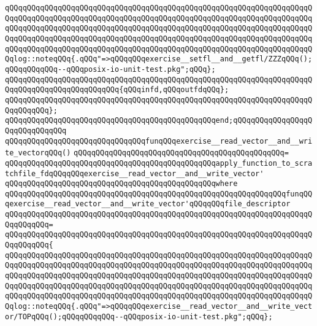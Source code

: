 \newline
\verb|qQQqqQQqqQQqqQQqqQQqqQQqqQQqqQQqqQQqqQQqqQQqqQQqqQQqqQQqqQQqqQQqqQQqqQQqqQQqqQQqqQQqqQQqqQQqqQQqqQQqqQQqqQQqqQQqqQQqqQQqqQQqqQQqqQQqqQQqqQQqqQQqqQQqqQQqqQQqqQQqqQQqqQQqqQQqqQQqqQQqqQQqqQQqqQQqqQQqqQQqqQQqqQQqqQQqqQQqqQQqqQQqqQQqqQQqqQQqqQQqqQQqqQQqqQQqqQQqqQQqqQQqqQQqqQQqqQQqqQQqqQQqqQQqqQQqqQQqqQQqqQQqqQQqqQQqqQQqqQQqqQQqqQQqqQQqqQQqqQQqqQQqqQQqqQQqlog::noteqQQq{.qQQq"=>qQQqqQQqexercise__setfl__and__getfl/ZZZqQQq();qQQqqQQqqQQq--qQQqposix-io-unit-test.pkg";qQQq};|\newline
\verb|qQQqqQQqqQQqqQQqqQQqqQQqqQQqqQQqqQQqqQQqqQQqqQQqqQQqqQQqqQQqqQQqqQQqqQQqqQQqqQQqqQQqqQQqqQQqqQQq{qQQqinfd,qQQqoutfdqQQq};|\newline
\verb|qQQqqQQqqQQqqQQqqQQqqQQqqQQqqQQqqQQqqQQqqQQqqQQqqQQqqQQqqQQqqQQqqQQqqQQqqQQqqQQq};|\newline
\verb|qQQqqQQqqQQqqQQqqQQqqQQqqQQqqQQqqQQqqQQqqQQqqQQqend;qQQqqQQqqQQqqQQqqQQqqQQqqQQqqQQq|\newline
\newline
\newline
\verb|qQQqqQQqqQQqqQQqqQQqqQQqqQQqqQQqfunqQQqexercise__read_vector__and__write_vectorqQQq()|\newline
\verb|qQQqqQQqqQQqqQQqqQQqqQQqqQQqqQQqqQQqqQQqqQQqqQQq=|\newline
\verb|qQQqqQQqqQQqqQQqqQQqqQQqqQQqqQQqqQQqqQQqqQQqqQQqapply_function_to_scratchfile_fdqQQqqQQqexercise__read_vector__and__write_vector'|\newline
\verb|qQQqqQQqqQQqqQQqqQQqqQQqqQQqqQQqqQQqqQQqqQQqqQQqwhere|\newline
\verb|qQQqqQQqqQQqqQQqqQQqqQQqqQQqqQQqqQQqqQQqqQQqqQQqqQQqqQQqqQQqqQQqfunqQQqexercise__read_vector__and__write_vector'qQQqqQQqfile_descriptor|\newline
\verb|qQQqqQQqqQQqqQQqqQQqqQQqqQQqqQQqqQQqqQQqqQQqqQQqqQQqqQQqqQQqqQQqqQQqqQQqqQQqqQQq=|\newline
\verb|qQQqqQQqqQQqqQQqqQQqqQQqqQQqqQQqqQQqqQQqqQQqqQQqqQQqqQQqqQQqqQQqqQQqqQQqqQQqqQQq{|\newline
\verb|qQQqqQQqqQQqqQQqqQQqqQQqqQQqqQQqqQQqqQQqqQQqqQQqqQQqqQQqqQQqqQQqqQQqqQQqqQQqqQQqqQQqqQQqqQQqqQQqqQQqqQQqqQQqqQQqqQQqqQQqqQQqqQQqqQQqqQQqqQQqqQQqqQQqqQQqqQQqqQQqqQQqqQQqqQQqqQQqqQQqqQQqqQQqqQQqqQQqqQQqqQQqqQQqqQQqqQQqqQQqqQQqqQQqqQQqqQQqqQQqqQQqqQQqqQQqqQQqqQQqqQQqqQQqqQQqqQQqqQQqqQQqqQQqqQQqqQQqqQQqqQQqqQQqqQQqqQQqqQQqqQQqqQQqqQQqqQQqqQQqqQQqqQQqqQQqlog::noteqQQq{.qQQq"=>qQQqqQQqexercise__read_vector__and__write_vector/TOPqQQq();qQQqqQQqqQQq--qQQqposix-io-unit-test.pkg";qQQq};|\newline
